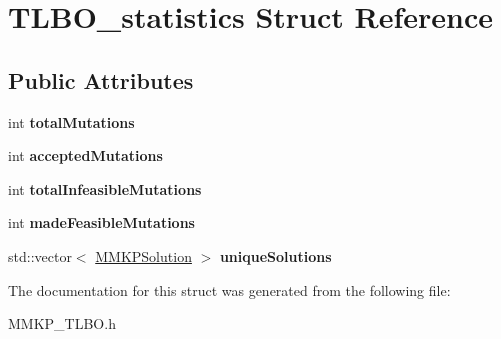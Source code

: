 \hypertarget{struct_t_l_b_o__statistics}{\section{T\+L\+B\+O\+\_\+statistics Struct Reference}
\label{struct_t_l_b_o__statistics}
}
\subsection*{Public Attributes}
\begin{DoxyCompactItemize}
\item 
\hypertarget{struct_t_l_b_o__statistics_ac9b054ef9b104dd79be490cce135eb70}{int {\bfseries total\+Mutations}}\label{struct_t_l_b_o__statistics_ac9b054ef9b104dd79be490cce135eb70}

\item 
\hypertarget{struct_t_l_b_o__statistics_adf222336eb684d4182b10912d6459414}{int {\bfseries accepted\+Mutations}}\label{struct_t_l_b_o__statistics_adf222336eb684d4182b10912d6459414}

\item 
\hypertarget{struct_t_l_b_o__statistics_a6d0784f4a388c182068a831df5d0a246}{int {\bfseries total\+Infeasible\+Mutations}}\label{struct_t_l_b_o__statistics_a6d0784f4a388c182068a831df5d0a246}

\item 
\hypertarget{struct_t_l_b_o__statistics_aac5abfe2e303c6706b540e44d6b63528}{int {\bfseries made\+Feasible\+Mutations}}\label{struct_t_l_b_o__statistics_aac5abfe2e303c6706b540e44d6b63528}

\item 
\hypertarget{struct_t_l_b_o__statistics_afe6dc3034db769ef19814ca505bb7f77}{std\+::vector$<$ \hyperlink{class_m_m_k_p_solution}{M\+M\+K\+P\+Solution} $>$ {\bfseries unique\+Solutions}}\label{struct_t_l_b_o__statistics_afe6dc3034db769ef19814ca505bb7f77}

\end{DoxyCompactItemize}


The documentation for this struct was generated from the following file\+:\begin{DoxyCompactItemize}
\item 
M\+M\+K\+P\+\_\+\+T\+L\+B\+O.\+h\end{DoxyCompactItemize}
